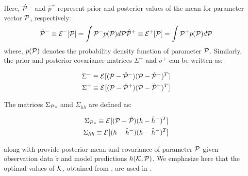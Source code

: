 \documentclass[]{article}
\begin{document}
Here, $\hat{\mathcal{P}}^-$ and $\hat{p}^+$ represent prior and posterior values of the mean for parameter vector $\mathcal{P}$, respectively:
\begin{eqnarray}
\hat{\mathcal{P}}^-\equiv \mathcal{E}^{-}[\mathcal{P}]=\int \mathcal{P}^- p(\mathcal{P})d\mathcal{P} \label{Pprior}
\hat{\mathcal{P}}^+\equiv \mathcal{E}^{+}[\mathcal{P}]=\int \mathcal{P}^+ p(\mathcal{P})d\mathcal{P} \label{Pposterior}
\end{eqnarray}
where, $p(\mathcal{P})$ denotes the probability density function of parameter $\mathcal{P}$. Similarly, the prior and posterior covariance matrices $\Sigma^{-}$ and $\sigma^+$ can be written as:

\begin{eqnarray}
\Sigma^-\equiv\mathcal{E}^{}[(\mathcal{P}-\hat{\mathcal{P}}^-)(\mathcal{P}-\hat{\mathcal{P}}^-)^T]\\
\Sigma^+\equiv\mathcal{E}^{}[(\mathcal{P}-\hat{\mathcal{P}}^+)(\mathcal{P}-\hat{\mathcal{P}}^+)^T]
\end{eqnarray}

The matrices $\Sigma_{\mathcal{P} z}$ amd $\Sigma_{hh}$ are defined as:

\begin{eqnarray}
\Sigma_{\mathcal{P} z} \equiv\mathcal{E}^{}[(\mathcal{P}-\hat{\mathcal{P}})(h-\hat{h}^-)^T]\\
\Sigma_{hh} \equiv\mathcal{E}^{}[(h-\hat{h}^-)(h-\hat{h}^-)^T]
\end{eqnarray}

 along with  provide posterior mean and covariance of parameter $\mathcal{P}$ given observation data $\tilde{z}$ and model predictions $h(\mathcal{K},\mathcal{P})$.
We emphasize here that the optimal values of $\mathcal{K}$, obtained from , are used in .


 

%

%
%
\end{document}
